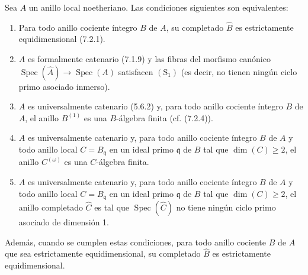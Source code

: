 \begin{theorem}[7.2.5]
\label{IV.2.s7.2.5-fr}
Sea $A$ un anillo local noetheriano. Las condiciones siguientes son
equivalentes:
\begin{enumerate}
\item[\textup{a)}] Para todo anillo cociente íntegro $B$ de $A$, su completado
$\widehat B$ es estrictamente equidimensional \textup{(7.2.1)}.
\item[\textup{b)}] $A$ es formalmente catenario \textup{(7.1.9)} y las fibras del
morfismo canónico
$\operatorname{Spec}(\widehat A)\to\operatorname{Spec}(A)$
satisfacen $(\mathrm S_1)$ \textup{(es decir,} no tienen ningún ciclo primo
asociado inmerso\textup{)}.
\item[\textup{c)}] $A$ es universalmente catenario \textup{(5.6.2)} y, para todo
anillo cociente íntegro $B$ de $A$, el anillo $B^{(1)}$ es una
$B$-álgebra finita \textup{(cf. (7.2.4))}.
\item[\textup{d)}] $A$ es universalmente catenario y, para todo anillo
cociente íntegro $B$ de $A$ y todo anillo local $C=B_{\mathfrak q}$
en un ideal primo $\mathfrak q$ de $B$ tal que $\dim(C)\geqslant2$,
el anillo $C^{(\omega)}$ es una $C$-álgebra finita.
\item[\textup{e)}] $A$ es universalmente catenario y, para todo anillo
cociente íntegro $B$ de $A$ y todo anillo local $C=B_{\mathfrak q}$
en un ideal primo $\mathfrak q$ de $B$ tal que $\dim(C)\geqslant2$,
el anillo completado $\widehat C$ es tal que
$\operatorname{Spec}(\widehat C)$ no tiene ningún ciclo primo asociado
de dimensión 1.
\end{enumerate}
Además, cuando se cumplen estas condiciones, para todo anillo
cociente $B$ de $A$ que sea estrictamente equidimensional, su
completado $\widehat B$ es estrictamente equidimensional.
\end{theorem}
